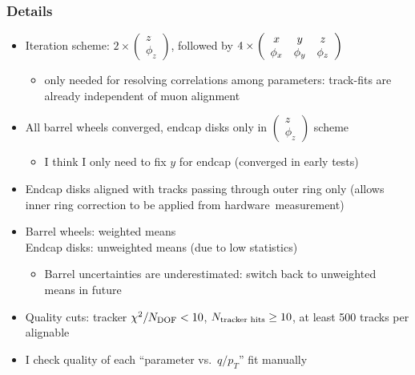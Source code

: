 \documentclass[compress]{beamer}
\begin{document}
\begin{frame}
\frametitle{Details}
\begin{itemize}\setlength{\itemsep}{0.1 cm}
\item Iteration scheme: $2\times \left(\begin{array}{c} z \\ \phi_z \end{array}\right)$, followed by
$4\times \left(\begin{array}{c c c} x & y & z \\ \phi_x & \phi_y & \phi_z \end{array}\right)$
\begin{itemize}
\item only needed for resolving correlations among parameters: track-fits
  are already independent of muon alignment
\end{itemize}

\item All barrel wheels converged, endcap disks only in $\left(\begin{array}{c} z \\ \phi_z \end{array}\right)$ scheme
\begin{itemize}
\item I think I only need to fix $y$ for endcap (converged in early tests)
\end{itemize}

\item Endcap disks aligned with tracks passing through outer ring only
  (allows inner ring correction to be applied from \mbox{hardware measurement)\hspace{-1 cm}}

\item Barrel wheels: weighted means \\
Endcap disks: unweighted means (due to low statistics)
\begin{itemize}
\item Barrel uncertainties are underestimated: switch back to unweighted means in future
\end{itemize}

\item Quality cuts: tracker $\chi^2/N_{\mbox{\scriptsize DOF}} < 10$,
  $N_{\mbox{\scriptsize tracker hits}} \ge 10$, at least 500 tracks
  per alignable

\item I check quality of each ``parameter vs.\ $q/p_T$'' fit manually

\end{itemize}
\end{frame}
\end{document}
